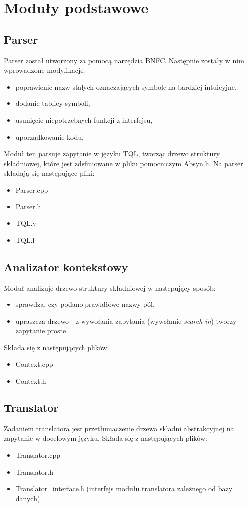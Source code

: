 \chapter{Moduły podstawowe}

\section{Parser}
Parser został utworzony za pomocą narzędzia BNFC. Następnie zostały w nim wprowadzone modyfikacje:
\begin{itemize}
\item poprawienie nazw stałych oznaczających symbole na bardziej intuicyjne,
\item dodanie tablicy symboli,
\item usunięcie niepotrzebnych funkcji z interfejsu,
\item uporządkowanie kodu.
\end{itemize}
Moduł ten parsuje zapytanie w języku TQL, tworząc drzewo struktury składniowej, które jest zdefiniowane w pliku pomocniczym Absyn.h.
Na parser składają się następujące pliki:
\begin{itemize}
 \item Parser.cpp
 \item Parser.h
 \item TQL.y %
 \item TQL.l %
\end{itemize}

\section{Analizator kontekstowy}
Moduł analizuje drzewo struktury składniowej w następujący sposób:
\begin{itemize}
 \item sprawdza, czy podano prawidłowe nazwy pól,  %
\item upraszcza drzewo - z wywołania zapytania (wywołanie \textit{search in}) tworzy zapytanie proste.
\end{itemize}
Składa się z następujących plików:
\begin{itemize}
 \item Context.cpp
 \item Context.h
\end{itemize}

\section{Translator}
Zadaniem translatora jest przetłumaczenie drzewa składni abstrakcyjnej na zapytanie w docelowym języku. 
Składa się z następujących plików:
\begin {itemize}
 \item Translator.cpp
 \item Translator.h
 \item Translator\_interface.h (interfejs modułu translatora zależnego od bazy danych)
\end {itemize}

